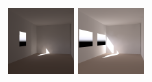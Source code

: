 
\begin{figure}[t]
\newcommand{\figwidth}{0.155\textwidth}
\includegraphics[width=\figwidth]{p3r_065_camera_chris_march.png} %
\includegraphics[width=\figwidth]{p3r_065_camera_chris_march_mod.png} %

\end{figure}
